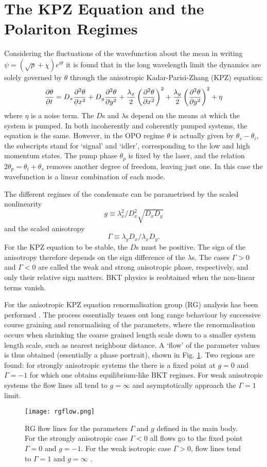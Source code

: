 \documentclass[letterpaper, 10 pt, conference]{IEEEtran}  %
\newcommand{\fig}[1]{Fig. #1}
\begin{document}
\section{The KPZ Equation and the Polariton Regimes}

Considering the fluctuations of the wavefunction about the mean in writing $\psi = (\sqrt{\rho} + \chi)e^{i \theta}$ it is found \cite{2015PhRvX...5a1017A, PhysRevX.7.041006} that in the long wavelength limit the dynamics are solely governed by $\theta$ through the anisotropic Kadar-Parisi-Zhang (KPZ) equation:
\[
\pdv{\theta}{t} = D_x \pdv[2]{\theta}{x} + D_y \pdv[2]{\theta}{y} + \frac{\lambda_x}{2}\left ( \pdv[2]{\theta}{x} \right)^2 + \frac{\lambda_y}{2} \left (\pdv[2]{\theta}{y} \right)^2 + \eta
\]
where $\eta$ is a noise term. 
The $D$s and $\lambda$s depend on the means at which the system is pumped. 
In both incoherently and coherently pumped systems, the equation is the same. 
However, in the OPO regime $\theta$ is actually given by $\theta_s - \theta_i$, the subscripts stand for `signal' and `idler', corresponding to the low and high momentum states.
The pump phase $\theta_p$ is fixed by the laser, and the relation $2 \theta_p = \theta_i + \theta_s$ removes another degree of freedom, leaving just one.  
In this case the wavefunction is a linear combination of each mode.

The different regimes of the condensate can be parametrised by the scaled nonlinearity 
\[
g \equiv \lambda_x^2/D_x^2\sqrt{D_x D_y}
\]
and the scaled anisotropy 
\[
\Gamma \equiv \lambda_y D_x / \lambda_x D_y.
\] 
For the KPZ equation to be stable, the $D$s must be positive.
The sign of the anisotropy therefore depends on the sign difference of the $\lambda$s. 
The cases $\Gamma > 0$ and $\Gamma < 0$ are called the weak and strong anisotropic phase, respectively, and only their relative sign matters.
BKT physics is reobtained when the non-linear terms vanish.

For the anisotropic KPZ equation renormalisation group (RG) analysis has been performed \cite{PhysRevLett.111.088701}.
The process essentially teases out long range behaviour by successive course graining and renormalising of the parameters, 
where the renormalisation occurs when shrinking the coarse grained length scale down to a smaller system length scale, such as nearest neighbour distance.
A `flow' of the parameter values is thus obtained (essentially a phase portrait), shown in \fig{\ref{fig:rgflows}}.
Two regions are found: for strongly anisotropic systems the there is a fixed point at $g=0$ and $\Gamma = -1$ for which one obtains equilibrium-like BKT regimes. 
For weak anisotropic systems the flow lines all tend to $g= \infty$ and asymptotically approach the $\Gamma =1$ limit. 
\begin{figure}[htbp!]
	\centering
	\texttt{[image: rgflow.png]}
	\caption{RG flow lines for the parameters $\Gamma$ and $g$ defined in the main body. 
	For the strongly anisotropic case $\Gamma < 0$ all flows go to the fixed point $\Gamma =0$ and $g=-1$. 
	For the weak isotropic case $\Gamma >0$, flow lines tend to $\Gamma =1$ and $g = \infty$ \cite{PhysRevLett.111.088701}. }
	\label{fig:rgflows}

\end{figure}
\end{document}
